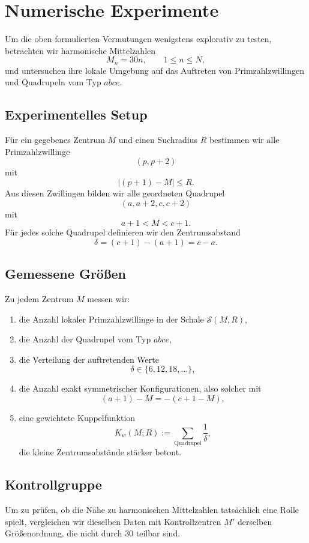 \documentclass[11pt,a4paper]{article}
\theoremstyle{definition}
\theoremstyle{plain}
\theoremstyle{remark}
\newcommand{\abs}[1]{\left|#1\right|}
\begin{document}
	\section{Numerische Experimente}
	
	Um die oben formulierten Vermutungen wenigstens explorativ zu testen, betrachten wir harmonische Mittelzahlen
	\[
	M_n = 30n,\qquad 1\le n\le N,
	\]
	und untersuchen ihre lokale Umgebung auf das Auftreten von Primzahlzwillingen und Quadrupeln vom Typ $abce$.
	
	\subsection{Experimentelles Setup}
	
	Für ein gegebenes Zentrum $M$ und einen Suchradius $R$ bestimmen wir alle Primzahlzwillinge
	\[
	(p,p+2)
	\]
	mit
	\[
	\abs{(p+1)-M}\le R.
	\]
	Aus diesen Zwillingen bilden wir alle geordneten Quadrupel
	\[
	(a,a+2,c,c+2)
	\]
	mit
	\[
	a+1 < M < c+1.
	\]
	Für jedes solche Quadrupel definieren wir den Zentrumsabstand
	\[
	\delta=(c+1)-(a+1)=c-a.
	\]
	
	\subsection{Gemessene Größen}
	
	Zu jedem Zentrum $M$ messen wir:
	
	\begin{enumerate}[label=\arabic*.]
		\item die Anzahl lokaler Primzahlzwillinge in der Schale $\mathcal S(M,R)$,
		\item die Anzahl der Quadrupel vom Typ $abce$,
		\item die Verteilung der auftretenden Werte
		\[
		\delta\in\{6,12,18,\dots\},
		\]
		\item die Anzahl exakt symmetrischer Konfigurationen, also solcher mit
		\[
		(a+1)-M = -(c+1-M),
		\]
		\item eine gewichtete Kuppelfunktion
		\[
		K_w(M;R):=\sum_{\text{Quadrupel}} \frac{1}{\delta},
		\]
		die kleine Zentrumsabstände stärker betont.
	\end{enumerate}
	
	\subsection{Kontrollgruppe}
	
	Um zu prüfen, ob die Nähe zu harmonischen Mittelzahlen tatsächlich eine Rolle spielt, vergleichen wir dieselben Daten mit Kontrollzentren $M'$ derselben Größenordnung, die nicht durch $30$ teilbar sind.
	
\end{document}
